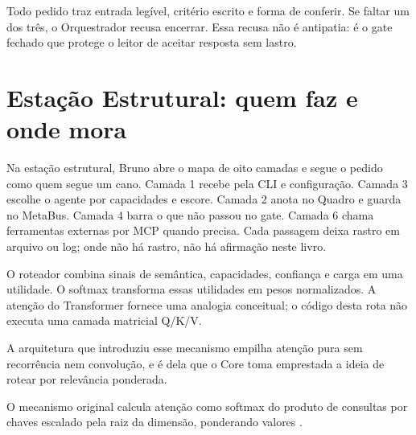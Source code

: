 
\begin{descricao}
Todo pedido traz entrada leg\'ivel, crit\'erio escrito e forma de conferir. Se faltar um dos tr\^es, o Orquestrador recusa encerrar. Essa recusa n\~ao \'e antipatia: \'e o gate fechado que protege o leitor de aceitar resposta sem lastro.
\end{descricao}

\section{Esta\c{c}\~ao Estrutural: quem faz e onde mora}

Na esta\c{c}\~ao estrutural, Bruno abre o mapa de oito camadas e segue o pedido como quem segue um cano. Camada 1 recebe pela CLI e configura\c{c}\~ao. Camada 3 escolhe o agente por capacidades e escore. Camada 2 anota no Quadro e guarda no MetaBus. Camada 4 barra o que n\~ao passou no gate. Camada 6 chama ferramentas externas por MCP quando precisa. Cada passagem deixa rastro em arquivo ou log; onde n\~ao h\'a rastro, n\~ao h\'a afirma\c{c}\~ao neste livro.

O roteador combina sinais de semântica, capacidades, confiança e carga em uma utilidade. O softmax transforma essas utilidades em pesos normalizados. A atenção do Transformer fornece uma analogia conceitual; o código desta rota não executa uma camada matricial Q/K/V.

A arquitetura que introduziu esse mecanismo empilha aten\c{c}\~ao pura sem recorr\^encia nem convolu\c{c}\~ao, e \'e dela que o Core toma emprestada a ideia de rotear por relev\^ancia ponderada.

O mecanismo original calcula aten\c{c}\~ao como softmax do produto de consultas por chaves escalado pela raiz da dimens\~ao, ponderando valores .

